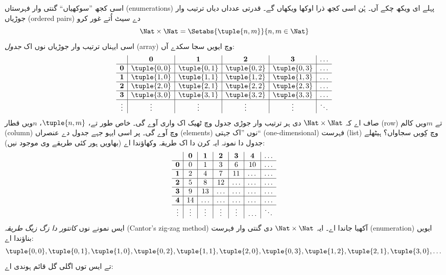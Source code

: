 \documentclass[../../../include/open-logic-section]{subfiles}
\begin{document}


\begin{explain}
اسی کجھ ”سوکھیاں“ گنتی وار فہرستاں (enumerations) پہلے ای ویکھ چکے
آں۔ ہُن اسی کجھ ذرا اوکھا ویکھاں گے۔ قدرتی عدداں دیاں ترتیب وار
جوڑیاں (ordered pairs) دے سیٹ اُتے غور
کرو
\[
\Nat \times \Nat = \Setabs{\tuple{n,m}}{n,m \in \Nat}
\]
اسی ایہناں ترتیب وار جوڑیاں نوں اک \emph{جدول} (array) وچ ایویں سجا سکدے آں:
\[
\begin{array}{ c | c | c | c | c | c}
& \mathbf 0 & \mathbf 1 & \mathbf 2 & \mathbf 3 & \dots \\
\hline
\mathbf 0 & \tuple{0,0} & \tuple{0,1} & \tuple{0,2} & \tuple{0,3} & \dots \\
\hline
\mathbf 1 & \tuple{1,0} & \tuple{1,1} & \tuple{1,2} & \tuple{1,3} & \dots \\
\hline
\mathbf 2 & \tuple{2,0} & \tuple{2,1} & \tuple{2,2} & \tuple{2,3} & \dots \\
\hline
\mathbf 3 & \tuple{3,0} & \tuple{3,1} & \tuple{3,2} & \tuple{3,3} & \dots \\
\hline
\vdots & \vdots & \vdots & \vdots & \vdots & \ddots\\
\end{array}
\]
صاف اے کہ $\Nat \times \Nat$ دی ہر ترتیب وار جوڑی جدول وچ ٹھیک اک
واری آوے گی۔ خاص طور تے، $\tuple{n,m}$، $n$ویں قطار (row) تے $m$ویں
کالم (column) وچ آوے گی۔ پر اسی ایہو جہے جدول دے عنصراں (elements)
نوں ”اک جہتی“ (one-dimensional) فہرست (list) وچ کِویں سجاواں؟
ہیٹھلے جدول دا نمونہ ایہ کرن دا اک طریقہ وکھاؤندا اے (بھاویں ہور کئی
طریقے وی موجود نیں):
\[
\begin{array}{ c | c | c | c | c | c | c}
& \mathbf 0 & \mathbf 1 & \mathbf 2 & \mathbf 3 & \mathbf 4 &\dots \\
\hline
\mathbf 0 & 0  & 1& 3 & 6& 10 &\ldots \\
\hline
\mathbf 1 &2 & 4& 7 & 11 & \dots &\ldots \\
\hline
\mathbf 2 & 5 & 8 & 12 & \ldots & \dots&\ldots \\
\hline
\mathbf 3 & 9 & 13 & \ldots & \ldots & \dots & \ldots \\
\hline
\mathbf 4 & 14 & \ldots & \ldots & \ldots & \dots & \ldots \\
\hline
\vdots & \vdots & \vdots & \vdots & \vdots&\ldots & \ddots\\
\end{array}
\]\noindent
ایس نمونے نوں \emph{کانتور دا زگ زیگ طریقہ} (Cantor's zig-zag method)
آکھیا جاندا اے۔ ایہ $\Nat \times \Nat$ دی گنتی وار فہرست
(enumeration) ایویں بناؤندا اے:
\[
\tuple{0,0}, \tuple{0,1}, \tuple{1,0}, \tuple{0,2}, \tuple{1,1},
\tuple{2,0}, \tuple{0,3}, \tuple{1,2}, \tuple{2,1}, \tuple{3,0}, \dots
\]
تے ایس توں اگلی گل قائم ہوندی اے:
\end{explain}
\end{document}

